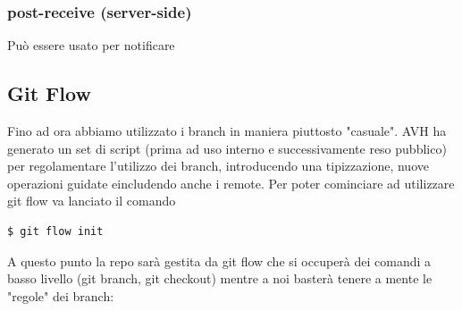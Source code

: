 \subsubsection{post-receive (server-side)}
Può essere usato per notificare

\subsection{Git Flow}
\noindent Fino ad ora abbiamo utilizzato i branch in maniera piuttosto "casuale". AVH ha generato un set di script (prima ad uso interno e successivamente reso pubblico) per regolamentare l'utilizzo dei branch, introducendo una tipizzazione, nuove operazioni guidate eincludendo anche i remote. Per poter cominciare ad utilizzare git flow va lanciato il comando
\begin{verbatim}
$ git flow init
\end{verbatim}
A questo punto la repo sarà gestita da git flow che si occuperà dei comandi a basso livello (git branch, git checkout) mentre a noi basterà tenere a mente le "regole" dei branch:
